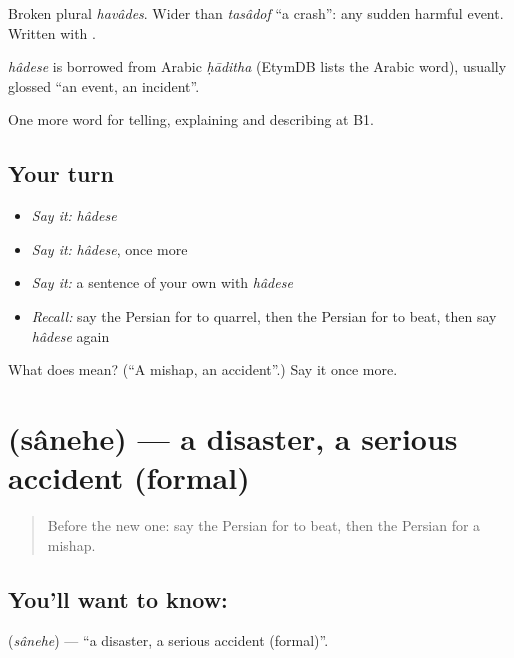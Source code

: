 Broken plural \emph{havâdes}. Wider than \emph{tasâdof} \textquotedblleft{}a crash\textquotedblright{}: any sudden harmful event. Written with .

\begin{cousinweb}
\emph{hâdese} is borrowed from Arabic \emph{ḥāditha} (EtymDB lists the Arabic word), usually glossed \textquotedblleft{}an event, an incident\textquotedblright{}.
\end{cousinweb}

\begin{grammarlens}[title={What you've built}]
One more word for telling, explaining and describing at B1.
\end{grammarlens}

\subsection*{Your turn}
\begin{itemize}
\raggedright
  \item \emph{Say it:} \emph{hâdese}
  \item \emph{Say it:} \emph{hâdese}, once more
  \item \emph{Say it:} a sentence of your own with \emph{hâdese}
  \item \emph{Recall:} say the Persian for to quarrel, then the Persian for to beat, then say \emph{hâdese} again
\end{itemize}

\begin{tcolorbox}[breakable,colback=teal!4,colframe=teal!35!black,title={Before you move on}]
What does  mean? (\textquotedblleft{}A mishap, an accident\textquotedblright{}.) Say it once more.
\end{tcolorbox}
\section[\texorpdfstring{\fa{سانحه} (sânehe)}{سانحه (sânehe)}]{ (sânehe) — a disaster, a serious accident (formal)}

\label{lesson:FA-C324-sanehe}



\begin{quote}
Before the new one: say the Persian for to beat, then the Persian for a mishap.
\end{quote}

\subsection*{You'll want to know: }
\textbf{} (\emph{sânehe}) — \textquotedblleft{}a disaster, a serious accident (formal)\textquotedblright{}.

